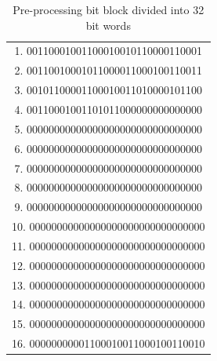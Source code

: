        \begin{table}[h!]
            \caption{Pre-processing bit block divided into 32 bit words}
            \centering
            \label{table:Pre-processing bit block divided into 32 bit words}
            
            \begin{tabular}{|c|}
            \hline  

            
              1. 00110001001100010010110000110001 \\
             
              2. 00110010001011000011000100110011 \\
             
              3. 00101100001100010011010000101100 \\
             
              4. 00110001001101011000000000000000 \\
             
              5. 00000000000000000000000000000000 \\
             
              6. 00000000000000000000000000000000 \\
             
              7. 00000000000000000000000000000000 \\
             
              8. 00000000000000000000000000000000 \\
             
              9. 00000000000000000000000000000000 \\
             
              10. 00000000000000000000000000000000 \\
             
              11. 00000000000000000000000000000000 \\
             
              12. 00000000000000000000000000000000 \\
             
              13. 00000000000000000000000000000000 \\
             
              14. 00000000000000000000000000000000 \\
             
              15. 00000000000000000000000000000000 \\
             
              16. 00000000001100010011000100110010 \\
             
            \hline
            \end{tabular}
        \end{table}
        
